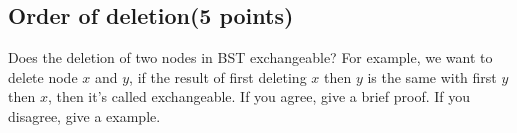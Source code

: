 \documentclass[11pt]{exam}
\begin{document}
    \subsection{Order of deletion(5 points)}
    Does the deletion of two nodes in BST exchangeable? For example, we want to delete node $x$ and $y$, if the result of first deleting $x$ then $y$ is the same with first $y$ then $x$, then it's called exchangeable. If you agree, give a brief proof. If you disagree, give a example.
    \begin{solution}
    \\ \hspace*{\fill} \\
    \\ \hspace*{\fill} \\
    \\ \hspace*{\fill} \\
    \\ \hspace*{\fill} \\
    \\ \hspace*{\fill} \\
    \\ \hspace*{\fill} \\
    \\ \hspace*{\fill} \\
    \\ \hspace*{\fill} \\
    \\ \hspace*{\fill} \\
    \\ \hspace*{\fill} \\
    \\ \hspace*{\fill} \\
    \\ \hspace*{\fill} \\
    \\ \hspace*{\fill} \\
    \\ \hspace*{\fill} \\
    \\ \hspace*{\fill} \\
    \\ \hspace*{\fill} \\
    \\ \hspace*{\fill} \\
    \\ \hspace*{\fill} \\
    \end{solution}
     
\end{document}
